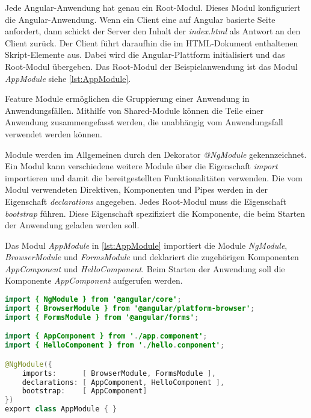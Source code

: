  
Jede Angular-Anwendung hat genau ein Root-Modul. Dieses Modul konfiguriert die Angular-Anwendung. Wenn ein Client eine auf Angular basierte Seite anfordert, dann schickt der Server den Inhalt der \textit{index.html} als Antwort an den Client zurück. Der Client führt daraufhin die im HTML-Dokument enthaltenen Skript-Elemente aus. Dabei wird die Angular-Plattform initialisiert und das Root-Modul übergeben. \autocites[vgl.][60]{Steyer.2017}[vgl.][226\psqq]{Freeman.2018}  Das Root-Modul der Beispielanwendung ist das Modul \textit{AppModule} siehe \autoref{lst:AppModule}. 

Feature Module ermöglichen die Gruppierung einer Anwendung in Anwendungsfällen. Mithilfe von Shared-Module können die Teile einer Anwendung zusammengefasst werden, die unabhängig vom Anwendungsfall verwendet werden können. \autocites[vgl.][528\psqq]{Freeman.2018}[vgl.][]{Google.c}[vgl.][105\psqq]{Steyer.2017}

Module werden im Allgemeinen durch den Dekorator \textit{@NgModule} gekennzeichnet. Ein Modul kann verschiedene weitere Module über die Eigenschaft \textit{import} importieren und damit die bereitgestellten Funktionalitäten verwenden. Die vom Modul verwendeten Direktiven, Komponenten und Pipes werden in der Eigenschaft \textit{declarations} angegeben. Jedes Root-Modul muss die Eigenschaft \textit{bootstrap} führen. Diese Eigenschaft spezifiziert die Komponente, die beim Starten der Anwendung geladen werden soll. 

Das Modul \textit{AppModule} in \autoref{lst:AppModule} importiert die Module \textit{NgModule}, \textit{BrowserModule} und \textit{FormsModule} und deklariert die zugehörigen Komponenten \textit{AppComponent} und \textit{HelloComponent}. Beim Starten der Anwendung soll die Komponente \textit{AppComponent} aufgerufen werden.

\begin{lstlisting}[caption=Das Root-Module in der Datei app.module.ts, label=lst:AppModule, language=Java]
import { NgModule } from '@angular/core';
import { BrowserModule } from '@angular/platform-browser';
import { FormsModule } from '@angular/forms';

import { AppComponent } from './app.component';
import { HelloComponent } from './hello.component';

@NgModule({
	imports:      [ BrowserModule, FormsModule ],
	declarations: [ AppComponent, HelloComponent ],
	bootstrap:    [ AppComponent]
})
export class AppModule { }

\end{lstlisting}

